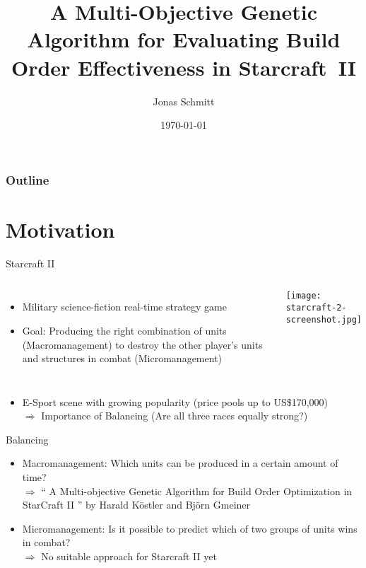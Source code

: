 \documentclass{beamer}
\title{A Multi-Objective Genetic Algorithm for Evaluating Build Order Effectiveness in Starcraft~II} %
\author{Jonas Schmitt} %
\date{\today} %
\begin{document}
\begin{frame}
\titlepage %
\end{frame}

\begin{frame}
\frametitle{Outline} %
\tableofcontents %
\end{frame}
\section{Motivation}
\begin{frame}{Starcraft II}
\begin{columns}[c] %
    \begin{itemize}
		\item Military science-fiction real-time strategy game
		\item \alert{Goal:} Producing the right combination of units (\alert{Macromanagement}) to destroy the other player's units and structures in combat (\alert{Micromanagement})
	\end{itemize}
    	\texttt{[image: starcraft-2-screenshot.jpg]}
\end{columns}
\begin{itemize}
\item E-Sport scene with growing popularity (price pools up to US\$170,000)
\\ $\Rightarrow$ Importance of \alert{Balancing} (Are all three races equally strong?) 
\end{itemize}
\end{frame}

\begin{frame}{Balancing}
\begin{itemize}
\item \alert{Macromanagement:} Which units can be produced in a certain amount of time?
\\ $\Rightarrow$ `` A Multi-objective Genetic Algorithm for Build Order Optimization in StarCraft II '' by Harald Köstler and Björn Gmeiner
\item \alert{Micromanagement:} Is it possible to predict which of two groups of units wins in combat?
\\ $\Rightarrow$ No suitable approach for Starcraft II yet
\end{itemize}
\end{frame}
\end{document}
